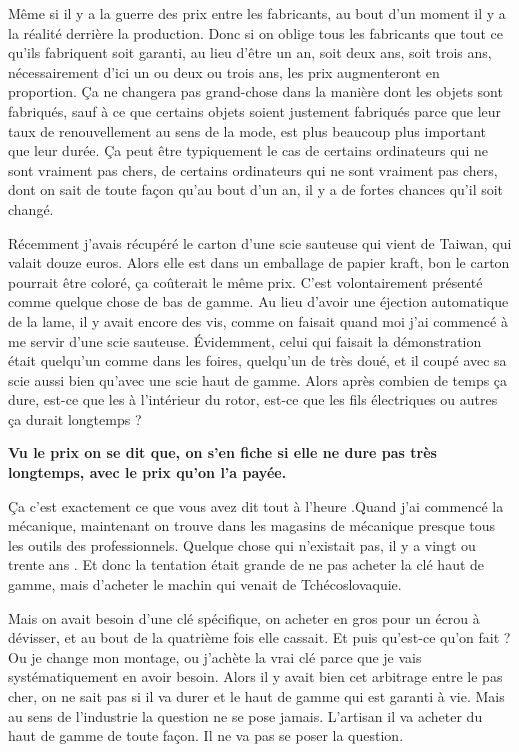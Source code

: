 \begin{small}
\smallbreak
Même si il y a la guerre des prix entre les fabricants, au bout d'un moment il y a la réalité derrière la production. Donc si on oblige tous les fabricants que tout ce qu’ils fabriquent soit garanti, au lieu d'être un an, soit deux ans, soit trois ans, nécessairement d'ici un ou deux ou trois ans, les prix augmenteront en proportion. Ça ne changera pas grand-chose dans la manière dont les objets sont fabriqués, sauf à ce que certains objets soient justement fabriqués parce que leur taux de renouvellement au sens de la mode, est plus beaucoup plus important que leur durée. Ça peut être typiquement le cas de certains ordinateurs qui ne sont vraiment pas chers, de certains ordinateurs qui ne sont vraiment pas chers, dont on sait de toute façon qu'au bout d'un an, il y a de fortes chances qu'il soit changé. 

Récemment j'avais récupéré le carton d'une scie sauteuse qui vient de Taiwan, qui valait douze euros. Alors elle est dans un emballage de papier kraft, bon le carton pourrait être coloré, ça coûterait le même prix. C'est volontairement présenté comme quelque chose de bas de gamme. Au lieu d'avoir une éjection automatique de la lame, il y avait encore des vis, comme on faisait quand moi j'ai commencé à me servir d'une scie sauteuse. Évidemment, celui qui faisait la démonstration était quelqu'un comme dans les foires, quelqu'un de très doué, et il coupé avec sa scie aussi bien qu'avec une scie haut de gamme. Alors après combien de temps ça dure, est-ce que les  à l'intérieur du rotor, est-ce que les fils électriques ou autres ça durait longtemps ?

\vspace{1\baselineskip}

\textbf{Vu le prix on se dit que, on s'en fiche si elle ne dure pas très longtemps, avec le prix qu'on l'a payée.}

\vspace{1\baselineskip}

Ça c'est exactement ce que vous avez dit tout à l'heure .Quand j'ai commencé la mécanique, maintenant on trouve dans les magasins de mécanique presque tous les outils des professionnels. Quelque chose qui n'existait pas, il y a vingt ou trente ans . Et donc la tentation était grande de ne pas acheter la clé haut de gamme, mais d'acheter le machin qui venait de Tchécoslovaquie. 

Mais on avait besoin d'une clé spécifique, on acheter en gros pour un écrou à dévisser, et au bout de la quatrième fois elle cassait. Et puis qu'est-ce qu'on fait ? Ou je change mon montage, ou j'achète la vrai clé parce que je vais systématiquement en avoir besoin. Alors il y avait bien cet arbitrage entre le pas cher, on ne sait pas si il va durer et le haut de gamme qui est garanti à vie. Mais au sens de l'industrie la question ne se pose jamais. L'artisan il va acheter du haut de gamme de toute façon. Il ne va pas se poser la question. 


\end{small}
